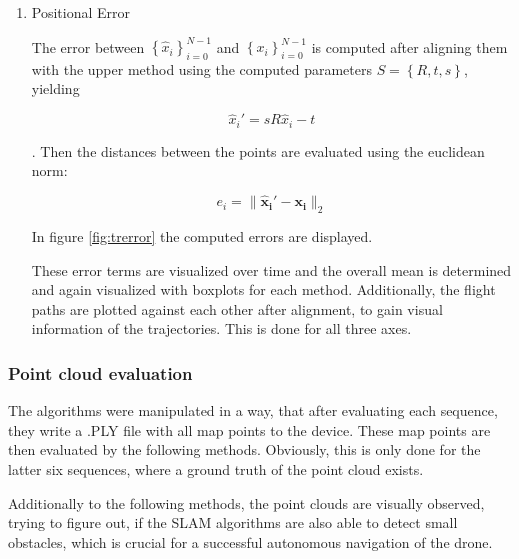 \begin{enumerate}
	\item{Positional Error}
	
	The error between $\left\{{\widehat{x}_i}\right\}_{i=0}^{N-1}$ and $\left\{{x_i}\right\}_{i=0}^{N-1}$ is computed after aligning them 
	with the upper method using the computed parameters $S = \left\{R,t,s\right\}$, yielding
	
	$$ \widehat{x}_i' = sR\widehat{x}_i - t $$
	
	. Then the distances between the points are evaluated using the euclidean norm: 
	
	$$ e_i = \lVert \mathbf{\widehat{x}_i' - x_i} \rVert_2$$
	
	
	In figure \ref{fig:trerror} the computed errors are displayed. 
	
	
	These error terms are visualized over time and the overall mean is determined and again visualized with boxplots for each method.
	Additionally, the flight paths are plotted against each other after alignment, to gain visual information of the trajectories. 
	This is done for all three axes. 

	
	\end{enumerate}
	
\subsubsection{Point cloud evaluation}

The algorithms were manipulated in a way, that after evaluating each sequence, they write a .PLY file with all map points to 
the device. These map points are then evaluated by the following methods. Obviously, this is only done for the latter six sequences, 
where a ground truth of the point cloud exists. 

Additionally to the following methods, the point clouds are visually observed, 
trying to figure out, if the SLAM algorithms are also able to detect small obstacles, which is crucial for a successful autonomous
 navigation of the drone. 
	
